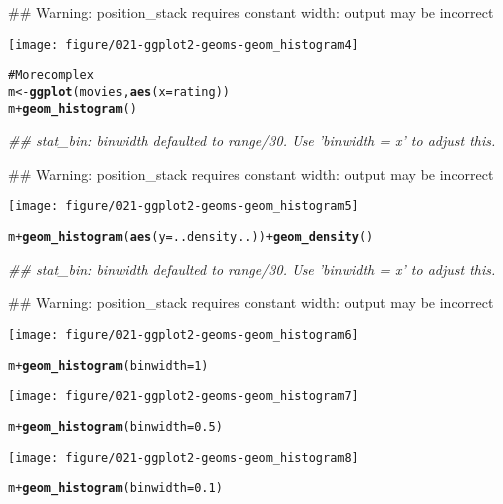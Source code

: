 \documentclass[a4paper,titlepage]{tufte-handout}\usepackage{graphicx, color}
\makeatletter
\def\maxwidth{ %
  \ifdim\Gin@nat@width>\linewidth
    \linewidth
  \else
    \Gin@nat@width
  \fi
}
\newcommand{\hlfunctioncall}[1]{\textcolor[rgb]{0.501960784313725,0,0.329411764705882}{\textbf{#1}}}%
\newcommand{\hlcomment}[1]{\textcolor[rgb]{0.180392156862745,0.6,0.341176470588235}{#1}}%
\newenvironment{kframe}{%
 \def\at@end@of@kframe{}%
 \ifinner\ifhmode%
  \def\at@end@of@kframe{\end{minipage}}%
  \begin{minipage}{\columnwidth}%
 \fi\fi%
 \def\FrameCommand##1{\hskip\@totalleftmargin \hskip-\fboxsep
 \colorbox{shadecolor}{##1}\hskip-\fboxsep
     \hskip-\linewidth \hskip-\@totalleftmargin \hskip\columnwidth}%
 \MakeFramed {\advance\hsize-\width
   \@totalleftmargin\z@ \linewidth\hsize
   \@setminipage}}%
 {\par\unskip\endMakeFramed%
 \at@end@of@kframe}
\newenvironment{knitrout}{}{} %
\makeatother
\begin{document}
\begin{knitrout}
\begin{kframe}
{\ttfamily\noindent\textcolor{warningcolor}{\#\# Warning: position\_stack requires constant width: output may be incorrect}}\end{kframe}
\texttt{[image: figure/021-ggplot2-geoms-geom\_histogram4]} 
\begin{kframe}\begin{alltt}

\hlcomment{# More complex}
m <- \hlfunctioncall{ggplot}(movies, \hlfunctioncall{aes}(x=rating))
m + \hlfunctioncall{geom_histogram}()
\end{alltt}


{\ttfamily\noindent\itshape\textcolor{messagecolor}{\#\# stat\_bin: binwidth defaulted to range/30. Use 'binwidth = x' to adjust this.}}

{\ttfamily\noindent\textcolor{warningcolor}{\#\# Warning: position\_stack requires constant width: output may be incorrect}}\end{kframe}
\texttt{[image: figure/021-ggplot2-geoms-geom\_histogram5]} 
\begin{kframe}\begin{alltt}
m + \hlfunctioncall{geom_histogram}(\hlfunctioncall{aes}(y = ..density..)) + \hlfunctioncall{geom_density}()
\end{alltt}


{\ttfamily\noindent\itshape\textcolor{messagecolor}{\#\# stat\_bin: binwidth defaulted to range/30. Use 'binwidth = x' to adjust this.}}

{\ttfamily\noindent\textcolor{warningcolor}{\#\# Warning: position\_stack requires constant width: output may be incorrect}}\end{kframe}
\texttt{[image: figure/021-ggplot2-geoms-geom\_histogram6]} 
\begin{kframe}\begin{alltt}

m + \hlfunctioncall{geom_histogram}(binwidth = 1)
\end{alltt}
\end{kframe}
\texttt{[image: figure/021-ggplot2-geoms-geom\_histogram7]} 
\begin{kframe}\begin{alltt}
m + \hlfunctioncall{geom_histogram}(binwidth = 0.5)
\end{alltt}
\end{kframe}
\texttt{[image: figure/021-ggplot2-geoms-geom\_histogram8]} 
\begin{kframe}\begin{alltt}
m + \hlfunctioncall{geom_histogram}(binwidth = 0.1)
\end{alltt}



\end{kframe}
\end{knitrout}
\end{document}
